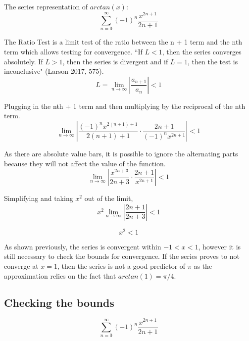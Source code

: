 \documentclass[12pt, titlepage]{article}
\begin{document}
The series representation of \(arctan(x)\):
\begin{equation*}
    \sum_{n=0}^{\infty} (-1)^{n} \frac{x^{2n+1}}{2n+1}
\end{equation*}
 
The Ratio Test is a limit test of the ratio between the n + 1 term and the nth term which allows testing for convergence. ``If \(L < 1\), then the series converges absolutely. If \(L > 1\), then the series is divergent and if \(L = 1\), then the test is inconclusive" (Larson 2017, 575).
\begin{equation*}
    L = \lim_{n \to \infty} \left |\frac{a_{n+1}}{a_{n}} \right | < 1
\end{equation*}

Plugging in the nth + 1 term and then multiplying by the reciprocal of the nth term.
\begin{equation*}
    \lim_{n \to \infty} \left |\frac{(-1)^{n}x^{2(n+1)+1}}{2(n+1)+1} \cdot \frac{2n+1}{(-1)^{n}x^{2n+1}} \right | < 1
\end{equation*}

As there are absolute value bars, it is possible to ignore the alternating parts because they will not affect the value of the function.
\begin{equation*}
    \lim_{n \to \infty} \left |\frac{x^{2n+3}}{2n+3} \cdot \frac{2n+1}{x^{2n+1}} \right | < 1
\end{equation*}

Simplifying and taking \(x^{2}\) out of the limit,
\begin{equation*}
    x^{2} \lim_{n \to \infty} \left |\frac{2n+1}{2n+3} \right | < 1
\end{equation*}

\begin{equation*}
    x^{2} < 1
\end{equation*}

As shown previously, the series is convergent within \(-1 < x < 1\), however it is still necessary to check the bounds for convergence. If the series proves to not converge at \(x = 1\), then the series is not a good predictor of \(\pi\) as the approximation relies on the fact that \(arctan(1) = \pi/4\).

\subsection{Checking the bounds}
\begin{equation*}
    \sum_{n=0}^{\infty} (-1)^{n} \frac{x^{2n+1}}{2n+1}
\end{equation*}
\end{document}
